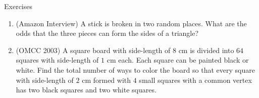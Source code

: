 \begin{xcb}{Exercises}
\begin{enumerate}
\begin{hint}
\end{hint}
\item (Amazon Interview)  A stick is broken in two random places. What are the odds that the three pieces can form the sides of a triangle? 
\begin{hint}
\end{hint}
\item (OMCC 2003)  A square board with side-length of $8$ cm is divided into $64$ squares with side-length of $1$ cm each. Each square can be painted black or white. Find the total number of ways to color the board so that every square with side-length of $2$ cm formed with $4$ small squares with a common vertex has two black squares and two white squares.
\begin{hint}
\end{hint}
\end{enumerate}
\end{xcb}
